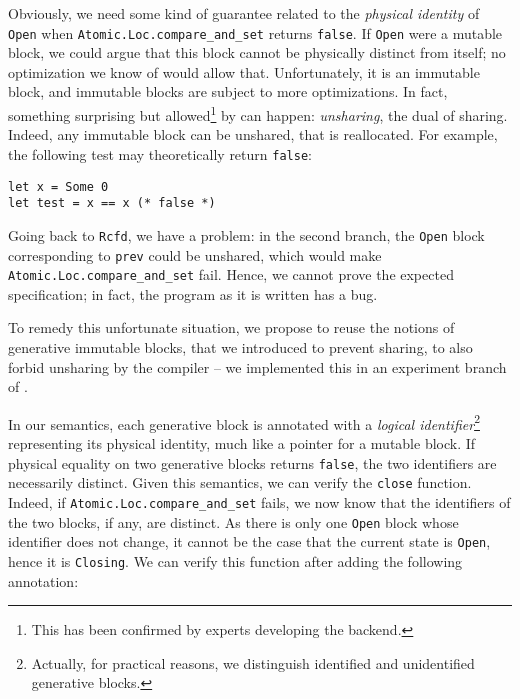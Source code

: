 Obviously, we need some kind of guarantee related to the \emph{physical identity} of \texttt{Open} when \texttt{Atomic.Loc.compare_and_set} returns \texttt{false}.
If \texttt{Open} were a mutable block, we could argue that this block cannot be physically distinct from itself; no optimization we know of would allow that.
Unfortunately, it is an immutable block, and immutable blocks are subject to more optimizations.
In fact, something surprising but allowed\footnote{This has been confirmed by \OCaml experts developing the \Flambda backend.} by \OCaml can happen: \emph{unsharing}, the dual of sharing.
Indeed, any immutable block can be unshared, that is reallocated.
For example, the following test may theoretically return \texttt{false}:

\begin{verbatim}
let x = Some 0
let test = x == x (* false *)
\end{verbatim}

Going back to \texttt{Rcfd}, we have a problem: in the second branch, the \texttt{Open} block corresponding to \texttt{prev} could be unshared, which would make \texttt{Atomic.Loc.compare_and_set} fail.
Hence, we cannot prove the expected specification; in fact, the program as it is written has a bug.

To remedy this unfortunate situation, we propose to reuse the notions of generative immutable blocks, that we introduced to prevent sharing, to also forbid unsharing by the \OCaml compiler -- we implemented this in an experiment branch of \OCaml.

In our semantics, each generative block is annotated with a \emph{logical identifier}\footnote{Actually, for practical reasons, we distinguish identified and unidentified generative blocks.} representing its physical identity, much like a pointer for a mutable block.
If physical equality on two generative blocks returns \texttt{false}, the two identifiers are necessarily distinct.
Given this semantics, we can verify the \texttt{close} function.
Indeed, if \texttt{Atomic.Loc.compare_and_set} fails, we now know that the identifiers of the two blocks, if any, are distinct.
As there is only one \texttt{Open} block whose identifier does not change, it cannot be the case that the current state is \texttt{Open}, hence it is \texttt{Closing}.
We can verify this function after adding the following annotation:

